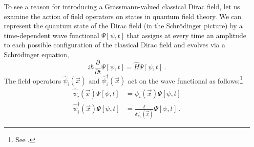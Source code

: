 \documentclass[onecolumn,secnumarabic,amsmath,amssymb,balancelastpage,nofootinbib]{article}
\begin{document}
To see a reason for introducing a Grassmann-valued classical Dirac field, let us examine the action of field operators on states in quantum field theory.  We can represent the quantum state of the Dirac field (in the Schr\"{o}dinger picture) by a time-dependent wave functional $\Psi[\psi,t]$ that assigns at every time an amplitude to each possible configuration of the classical Dirac field and evolves via a Schr\"{o}dinger equation,
\begin{equation}
i \hbar \frac{\partial}{\partial t}\Psi[\psi,t]=\widehat{H}\Psi[\psi,t]
\ .
\end{equation}
The field operators $\widehat{\psi}_i(\vec{x})$ and $\widehat{\psi}_i^{\dagger}(\vec{x})$ act on the wave functional as follows:\footnote{See \citet[pg.\ 217]{hatfield}.}
\begin{align}
\widehat{\psi}_i(\vec{x})\Psi[\psi,t]&=\psi_i(\vec{x})\Psi[\psi,t]
\nonumber
\\
\widehat{\psi}_i^{\dagger}(\vec{x})\Psi[\psi,t]&=\frac{\delta}{\delta \psi_i(\vec{x})}\Psi[\psi,t]
\label{fieldoperatorsonWFs}
\ .
\end{align}
\end{document}
